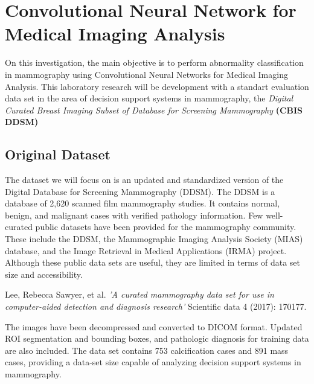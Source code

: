 \documentclass{book}
\begin{document}

    \chapter{Convolutional Neural Network for Medical Imaging Analysis}  %

    On this investigation, the main objective is to perform abnormality classification in mammography using Convolutional Neural Networks for Medical Imaging Analysis. This laboratory research will be development with a standart evaluation data set in the area of decision support systems in mammography, the \textit{Digital Curated Breast Imaging Subset of Database for Screening Mammography} \textbf{(CBIS DDSM)}
    
        \section{Original Dataset}
        The dataset we will focus on is an updated and standardized version of the Digital Database for Screening Mammography (DDSM). The DDSM is a database of 2,620 scanned film mammography studies. It contains normal, benign, and malignant cases with verified pathology information. Few well-curated public datasets have been provided for the mammography community. These include the DDSM, the Mammographic Imaging Analysis Society (MIAS) database, and the Image Retrieval in Medical Applications (IRMA) project. Although these public data sets are useful, they are limited in terms of data set size and accessibility.

        \begin{center}
            \begin{minipage}{0.9\linewidth}
                \vspace{5pt}%
                {\small
                    Lee, Rebecca Sawyer, et al. \textit{'A curated mammography data set for use in computer-aided detection and diagnosis research'} Scientific data 4 (2017): 170177.
                }
                \vspace{5pt}%
            \end{minipage}
        \end{center}

        The images have been decompressed and converted to DICOM format. Updated ROI segmentation and bounding boxes, and pathologic diagnosis for training data are also included. The data set contains 753 calcification cases and 891 mass cases, providing a data-set size capable of analyzing decision support systems in mammography.
\end{document}
